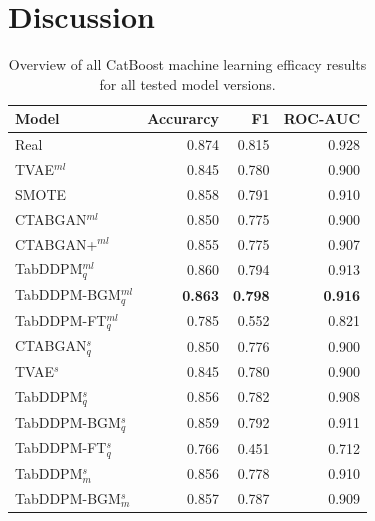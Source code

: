 \section{Discussion}
\label{ch:results-discussion}

\begin{table}[h]
	\centering
	\begin{tabular}{lrrr}
		\toprule
		\textbf{Model}       & \textbf{Accurarcy} & \textbf{F1}     & \textbf{ROC-AUC} \\
		\midrule
		Real                 & 0.874              & 0.815           & 0.928            \\
		TVAE$^{ml}$          & 0.845              & 0.780           & 0.900            \\
		SMOTE                & 0.858              & 0.791           & 0.910            \\
		CTABGAN$^{ml}$       & 0.850              & 0.775           & 0.900            \\
		CTABGAN+$^{ml}$      & 0.855              & 0.775           & 0.907            \\
		TabDDPM$^{ml}_q$     & 0.860              & 0.794           & 0.913            \\
		TabDDPM-BGM$^{ml}_q$ & \textbf{0.863}     & \textbf{0.798} & \textbf{0.916}   \\
		TabDDPM-FT$^{ml}_q$  & 0.785              & 0.552           & 0.821            \\
		CTABGAN$^{s}_q$      & 0.850              & 0.776           & 0.900            \\
		TVAE$^{s}$           & 0.845              & 0.780           & 0.900            \\
		TabDDPM$^{s}_q$      & 0.856              & 0.782           & 0.908            \\
		TabDDPM-BGM$^{s}_q$  & 0.859              & 0.792           & 0.911            \\
		TabDDPM-FT$^{s}_q$   & 0.766              & 0.451           & 0.712            \\
		TabDDPM$^{s}_m$      & 0.856              & 0.778           & 0.910            \\
		TabDDPM-BGM$^{s}_m$  & 0.857              & 0.787           & 0.909            \\
		\bottomrule
	\end{tabular}
	\caption[]{Overview of all CatBoost machine learning efficacy results for all tested model versions.}
	\label{tab:ml-all}
\end{table}


